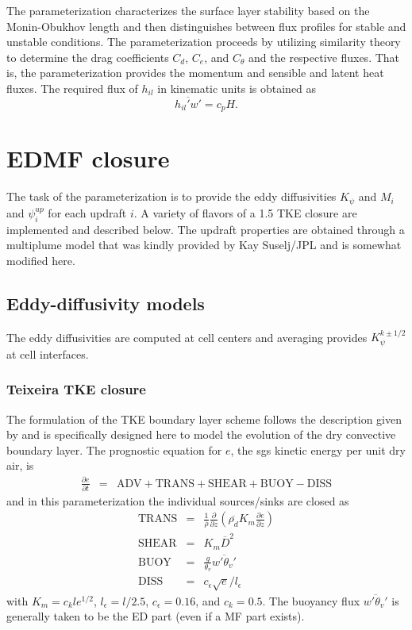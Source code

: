 \documentclass[dvipdfmx,a4paper,10pt]{article}
\begin{document}
The parameterization characterizes the surface layer stability based on the Monin-Obukhov length and then distinguishes between flux profiles for stable and unstable conditions. The parameterization proceeds by utilizing similarity theory to determine the drag coefficients $C_d$, $C_e$, and $C_{\theta}$ and the respective fluxes. That is, the parameterization provides the momentum and sensible and latent heat fluxes. The required flux of $h_{il}$ in kinematic units is obtained as 
\begin{equation}\label{eqn:whli}
 \overline{h_{il}'w'} = c_p H.
\end{equation} 

\section{EDMF closure}\label{sec:closure}

The task of the parameterization is to provide the eddy diffusivities $K_{\psi}$ and $M_i$ and $\psi^{up}_i$ for each updraft $i$. A variety of flavors of a 1.5 TKE closure are implemented and described below. The updraft properties are obtained through a multiplume model that was kindly provided by Kay Suselj/JPL and is somewhat modified here.


\subsection{Eddy-diffusivity models}

The eddy diffusivities are computed at cell centers and averaging provides $K_{\psi}^{k\pm 1/2}$ at cell interfaces. 

\subsubsection{Teixeira TKE closure}

The formulation of the TKE boundary layer scheme follows the description given by \cite{teixeira04} and is specifically designed here to model the evolution of the dry convective boundary layer. The prognostic equation for $e$, the sgs kinetic energy per unit dry air, is
\begin{eqnarray}\label{eqn:tkebudget}
 \frac{\partial e}{\partial t}&=& \mathrm{ADV} + \mathrm{TRANS} + \mathrm{SHEAR} + \mathrm{BUOY} - \mathrm{DISS}
\end{eqnarray}
and in this parameterization the individual sources/sinks are closed as
\begin{eqnarray}
 \mathrm{TRANS} &=& \frac{1}{\overline{\rho}}\frac{\partial}{\partial z} (\overline{\rho_d} K_m  \frac{\partial e}{\partial z})\\
 \mathrm{SHEAR} &=& K_m \overline{D}^2 \\
 \mathrm{BUOY} &=& \frac{g}{\theta_v} \overline{w'\theta_v'}\\
 \mathrm{DISS}&=& c_{\epsilon}\sqrt{e}/l_{\epsilon}
\end{eqnarray}
with $K_m=c_k l e^{1/2}$, $l_{\epsilon}=l/2.5$, $c_{\epsilon}=0.16$, and $c_k=0.5$. The buoyancy flux $\overline{w'\theta_v'}$ is generally taken to be the ED part (even if a MF part exists).
\end{document}

